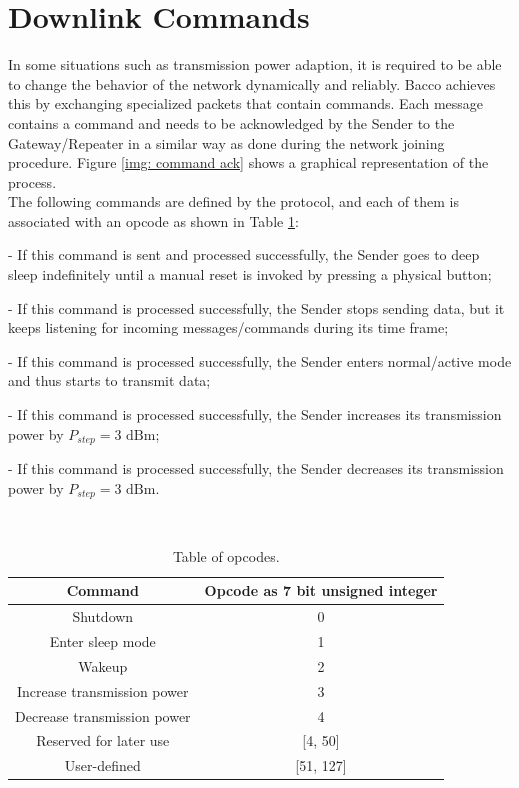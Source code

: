 \section{Downlink Commands}
In some situations such as transmission power adaption, it is required to be able to change the behavior of the
network dynamically and reliably. Bacco achieves this by exchanging specialized packets that contain
commands. Each message contains a command and needs to be acknowledged by the Sender to the Gateway/Repeater in a similar way as done during the
network joining procedure. Figure \ref{img: command ack} shows a graphical representation of the process.\\
The following commands are defined by the protocol, and each of them is associated with an opcode as shown in Table
\ref{tab: opcodes}:
\begin{description}[font=$\bullet$~\normalfont\scshape\color{blue!50!black}]
    \item [Shutdown] - If this command is sent and processed successfully, the Sender goes to deep sleep indefinitely until a
        manual reset is invoked by pressing a physical button;
    \item [Enter sleep mode] - If this command is processed successfully, the Sender stops sending data, but it keeps
        listening for incoming messages/commands during its time frame;
    \item [Wakeup] - If this command is processed successfully, the Sender enters normal/active mode
        and thus starts to transmit data;
    \item [Increase transmission power] - If this command is processed successfully, the Sender increases its
        transmission power by $P_{step}= 3 \text{ dBm}$;
    \item [Decrease transmission power] - If this command is processed successfully, the Sender decreases its
        transmission power by $P_{step}= 3 \text{ dBm}$.
\end{description}
\\
\begin{table}[ht]
    \caption{Table of opcodes.}
    \label{tab: opcodes}
    \centering
    \begin{tabular}{ |c|c| }
        \hline
        \textbf{Command} & \textbf{Opcode as 7 bit unsigned integer}\\
        \hline
        Shutdown & 0\\
        \hline
        Enter sleep mode & 1\\
        \hline
        Wakeup & 2\\
        \hline
        Increase transmission power & 3\\
        \hline
        Decrease transmission power & 4\\
        \hline
        Reserved for later use & [4, 50]\\
        \hline
        User-defined & [51, 127]\\
        \hline
    \end{tabular}
\end{table}

